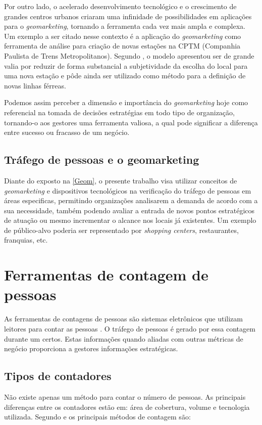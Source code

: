 Por outro lado, o acelerado desenvolvimento tecnológico e o crescimento de
grandes centros urbanos criaram uma infinidade de possibilidades em aplicações
para o \emph{geomarketing}, tornando a ferramenta cada vez mais ampla e
complexa. Um exemplo a ser citado nesse contexto é a aplicação do
\emph{geomarketing} como ferramenta de análise para criação de novas estações na
CPTM (Companhia Paulista de Trens Metropolitanos). Segundo
, o modelo apresentou ser de grande valia por reduzir de
forma substancial a subjetividade da escolha do local para uma nova estação e
pôde ainda ser utilizado como método para a definição de novas linhas férreas.

Podemos assim perceber a dimensão e importância do \emph{geomarketing} hoje como
referencial na tomada de decisões estratégias em todo tipo de organização,
tornando-o aos gestores uma ferramenta valiosa,  a qual pode significar a
diferença entre sucesso ou fracasso de um negócio.

\subsection{Tráfego de pessoas e o geomarketing}
Diante do exposto na \autoref{Geom}, o presente trabalho
visa utilizar conceitos de \emph{geomarketing} e dispositivos tecnológicos na
verificação do tráfego de pessoas em áreas especificas, permitindo organizações analisarem a
demanda de acordo com a sua necessidade, também podendo avaliar a entrada
de novos pontos estratégicos de atuação ou mesmo incrementar o alcance nos
locais já existentes. Um exemplo de público-alvo poderia ser representado por
\emph{shopping centers}, restaurantes, franquias, etc.

\section{Ferramentas de contagem de pessoas}
As ferramentas de contagens de pessoas
são sistemas eletrônicos que utilizam leitores para contar as pessoas
\cite{trafsysdef}. O tráfego de pessoas é gerado por essa contagem durante
um certos. Estas informações quando aliadas com outras métricas de
negócio proporciona a gestores informações estratégicas.

\subsection{Tipos de contadores}
Não existe apenas um método para contar o número de pessoas. As principais
diferenças entre os contadores estão em: área de cobertura, volume e tecnologia
utilizada. Segundo  e  os principais métodos de
contagem são:

